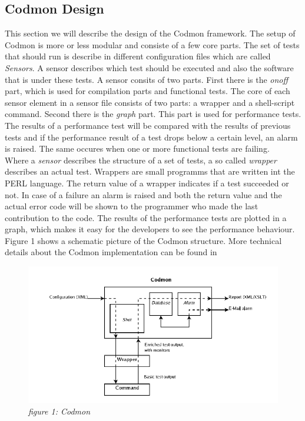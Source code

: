 \documentclass[a4paper,10pt]{scrartcl}
\begin{document}
\subsection{Codmon Design}
\label{subsec:CodmonDesign}
This section we will describe the design of the Codmon framework. The setup of Codmon is more or less modular and consiste of a few core parts. The set of tests that should run is describe
in different configuration files which are called \emph{Sensors}. A sensor describes which test should be executed and also the software that is under these tests. A sensor consits of two
parts. First there is the \emph{onoff} part, which is used for compilation parts and functional tests. The core of each sensor element in a sensor file consists of two parts: a wrapper and
a shell-script command. Second there is the \emph{graph} part. This part is used for performance tests. The results of a performance test will be compared with the results of previous tests 
and if the performance result of a test drops below a certain level, an alarm is raised. The same occures when one or more functional tests are failing.\\

\noindent Where a \emph{sensor} describes the structure of a set of tests, a so called \emph{wrapper} describes an actual test. Wrappers are small programms that are written int the PERL
language. The return value of a wrapper indicates if a test succeeded or not. In case of a failure an alarm is raised and both the return value and the actual error code will be shown to
the programmer who made the last contribution to the code. The results of the performance tests are plotted in a graph, which makes it easy for the developers to see the performance
behaviour. Figure 1 shows a schematic picture of the Codmon structure. More technical details about the Codmon implementation can be found in \cite{Codmon}

\begin{figure}[!ht]
  \caption{\emph{figure 1: Codmon}}
  \centering
    \includegraphics[scale=0.5]{codmon}
\end{figure}
\end{document}
